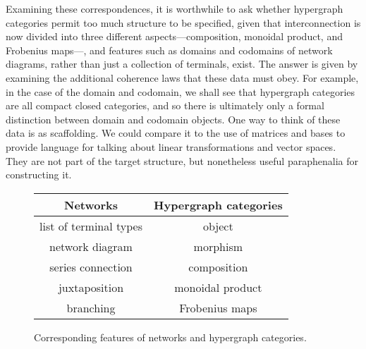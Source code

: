 Examining these correspondences, it is worthwhile to ask whether hypergraph
categories permit too much structure to be specified, given that interconnection
is now divided into three different aspects---composition, monoidal product, and
Frobenius maps---, and features such as domains and codomains of network
diagrams, rather than just a collection of terminals, exist. The answer is given
by examining the additional coherence laws that these data must obey. For
example, in the case of the domain and codomain, we shall see that hypergraph
categories are all compact closed categories, and so there is ultimately only a
formal distinction between domain and codomain objects. One way to think of
these data is as scaffolding. We could compare it to the use of matrices and
bases to provide language for talking about linear transformations and vector
spaces.  They are not part of the target structure, but nonetheless useful
paraphenalia for constructing it.

\begin{figure}
  \begin{center}
  \begin{tabular}{c|c}
    Networks & Hypergraph categories \\
    \hline 
    list of terminal types & object \\
    network diagram & morphism \\
    series connection & composition \\
    juxtaposition & monoidal product \\
    branching & Frobenius maps
  \end{tabular}
  \end{center}
  \caption{Corresponding features of networks and hypergraph categories.}
\end{figure}

